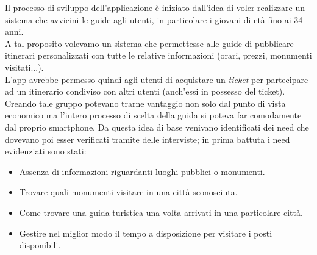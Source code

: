 Il processo di sviluppo dell'applicazione è iniziato dall'idea di voler realizzare un sistema che avvicini le guide agli utenti, in particolare i giovani di età fino ai 34 anni.\\
A tal proposito volevamo un sistema che permettesse alle guide di pubblicare itinerari personalizzati con tutte le relative informazioni (orari, prezzi, monumenti visitati...).\\
L'app avrebbe permesso quindi agli utenti di acquistare un \emph{ticket} per partecipare ad un itinerario condiviso con altri utenti (anch'essi in possesso del ticket). Creando tale gruppo potevano trarne vantaggio non solo dal punto di vista economico ma l'intero processo di scelta della guida si poteva far comodamente dal proprio smartphone.
Da questa idea di base venivano identificati dei need che dovevano poi esser verificati tramite delle interviste; in prima battuta i need evidenziati sono stati:
\begin{itemize}
	\item Assenza di informazioni riguardanti luoghi pubblici o monumenti.
	\item Trovare quali monumenti visitare in una città sconosciuta.
	\item Come trovare una guida turistica una volta arrivati in una particolare città.
	\item Gestire nel miglior modo il tempo a disposizione per visitare i posti disponibili.
	
\end{itemize}
